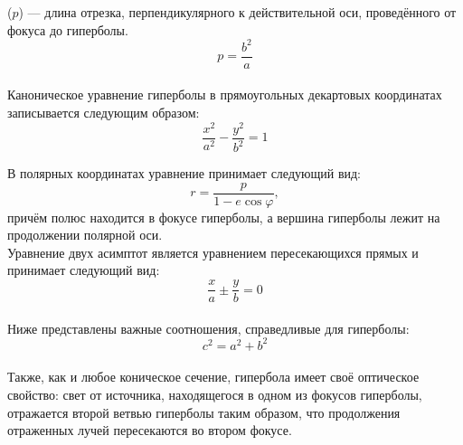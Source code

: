  ($p$) --- длина отрезка, перпендикулярного к действительной оси, проведённого от фокуса до гиперболы.
\begin{equation}
p=\frac{b^2}{a}
\end{equation}\\

Каноническое уравнение гиперболы в прямоугольных декартовых координатах записывается следующим образом:\begin{equation}
\frac{x^2}{a^2}-\frac{y^2}{b^2}=1
\end{equation}

В полярных координатах уравнение принимает следующий вид:\begin{equation}
r=\frac{p}{1-e\cos\varphi},
\end{equation}
причём полюс находится в фокусе гиперболы, а вершина гиперболы лежит на продолжении полярной оси.\\

Уравнение двух асимптот является уравнением пересекающихся прямых и принимает следующий вид:\begin{equation}
\frac{x}{a}\pm\frac{y}{b}=0
\end{equation}\\

Ниже представлены важные соотношения, справедливые для гиперболы:
\begin{equation}
c^2=a^2+b^2
\end{equation}\\

Также, как и любое коническое сечение, гипербола имеет своё оптическое свойство: свет от источника, находящегося в одном из фокусов гиперболы, отражается второй ветвью гиперболы таким образом, что продолжения отраженных лучей пересекаются во втором фокусе.
